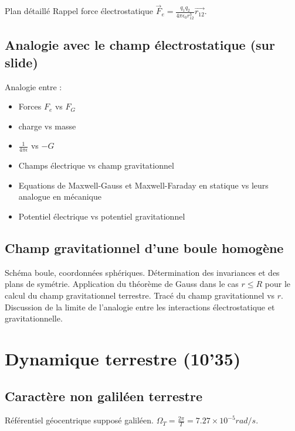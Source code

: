 \begin{reportBlock}{Plan détaillé}
Rappel force électrostatique $\overrightarrow{F}_e = \frac{q_1 q_2}{4\pi \epsilon_0 r_{12}^3} \overrightarrow{r_{12}}$.


\subsection{Analogie avec le champ électrostatique (sur slide)}

Analogie entre :

\begin{itemize}
\item Forces $F_e$ vs $F_G$
\item charge vs masse
\item $\frac{1}{4 \pi \epsilon}$ vs $-G$
\item Champs électrique vs champ gravitationnel
\item Equations de Maxwell-Gauss et Maxwell-Faraday en statique vs leurs analogue en mécanique
\item Potentiel électrique vs potentiel gravitationnel
\end{itemize}

\subsection{Champ gravitationnel d'une boule homogène}

Schéma boule, coordonnées sphériques. Détermination des invariances et des plans de symétrie. Application du théorème de Gauss dans le cas $r\leq R$ pour le calcul du champ gravitationnel terrestre. Tracé du champ gravitationnel vs $r$. Discussion de la limite de l'analogie entre les interactions électrostatique et gravitationnelle.

\section{Dynamique terrestre (10'35)}

\subsection{Caractère non galiléen terrestre}

Référentiel géocentrique supposé galiléen.
$\Omega_T = \frac{2 \pi}{T}=7.27\times10^{-5} rad/s$.  \\


\end{reportBlock}
